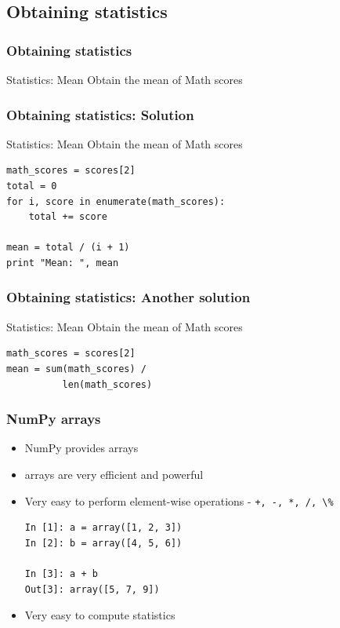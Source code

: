 \documentclass[14pt,compress]{beamer}
\newcommand{\typ}[1]{\lstinline{#1}}
\begin{document}
\subsection{Obtaining statistics}
\begin{frame}[fragile]
  \frametitle{Obtaining statistics}
  \begin{block}{Statistics: Mean}
    Obtain the mean of Math scores
  \end{block}
\end{frame}

\begin{frame}[fragile]
  \frametitle{Obtaining statistics: Solution}
  \begin{block}{Statistics: Mean}
    Obtain the mean of Math scores
  \end{block}
  \begin{lstlisting}
math_scores = scores[2]
total = 0
for i, score in enumerate(math_scores):
    total += score

mean = total / (i + 1)
print "Mean: ", mean
  \end{lstlisting}
\end{frame}

\begin{frame}[fragile]
  \frametitle{Obtaining statistics: Another solution}
  \begin{block}{Statistics: Mean}
    Obtain the mean of Math scores
  \end{block}
  \begin{lstlisting}
math_scores = scores[2]
mean = sum(math_scores) /
          len(math_scores)
  \end{lstlisting}
\end{frame}

\begin{frame}[fragile]
\frametitle{NumPy arrays}
  \begin{itemize}
    \item NumPy provides arrays
    \item arrays are very efficient and powerful 
    \item Very easy to perform element-wise operations - \typ{+, -, *, /, \%}
    \begin{lstlisting}
In [1]: a = array([1, 2, 3])
In [2]: b = array([4, 5, 6])

In [3]: a + b
Out[3]: array([5, 7, 9])
    \end{lstlisting}
    \item Very easy to compute statistics
  \end{itemize}
\end{frame}
\end{document}
